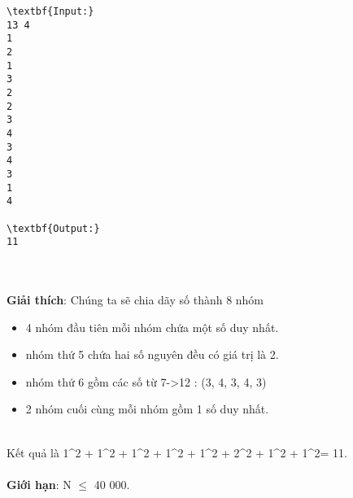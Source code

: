 \begin{verbatim}
\textbf{Input:}
13 4
1
2
1
3
2
2
3
4
3
4
3
1
4

\textbf{Output:}
11\end{verbatim}


\\
\\\textbf{Giải thích}: Chúng ta sẽ chia dãy số thành 8 nhóm
\begin{itemize}
	\item 4 nhóm đầu tiên mỗi nhóm chứa một số duy nhất.
	\item nhóm thứ 5 chứa hai số nguyên đều có giá trị là 2.
	\item nhóm thứ 6 gồm các số từ 7->12 : (3, 4, 3, 4, 3)
	\item 2 nhóm cuối cùng mỗi nhóm gồm 1 số duy nhất.
\end{itemize}


\\Kết quả là 1^2 + 1^2 + 1^2 + 1^2 + 1^2 + 2^2 + 1^2 + 1^2= 11.
\\
\\\textbf{Giới hạn}: N  $\le$  40 000.